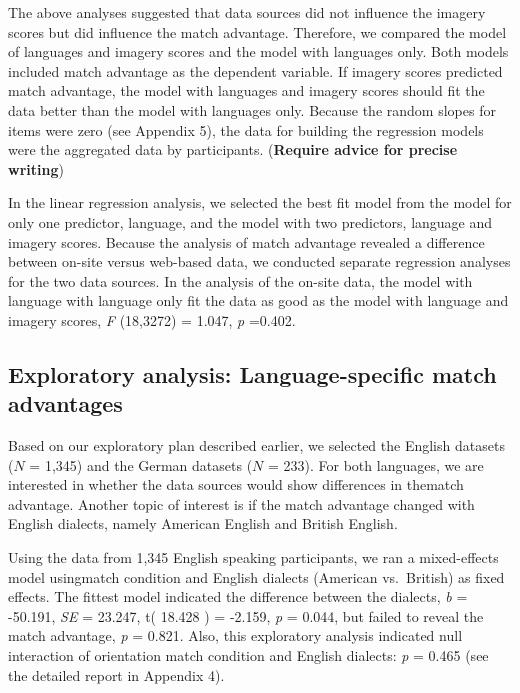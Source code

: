\documentclass[
  man,floatsintext]{apa6}
\begin{document}
The above analyses suggested that data sources did not influence the imagery scores but did influence the match advantage. Therefore, we compared the model of languages and imagery scores and the model with languages only. Both models included match advantage as the dependent variable. If imagery scores predicted match advantage, the model with languages and imagery scores should fit the data better than the model with languages only. Because the random slopes for items were zero (see Appendix 5), the data for building the regression models were the aggregated data by participants. (\textbf{Require advice for precise writing})

In the linear regression analysis, we selected the best fit model from the model for only one predictor, language, and the model with two predictors, language and imagery scores. Because the analysis of match advantage revealed a difference between on-site versus web-based data, we conducted separate regression analyses for the two data sources. In the analysis of the on-site data, the model with language with language only fit the data as good as the model with language and imagery scores, \emph{F} (18,3272) = 1.047, \emph{p} =0.402.

\hypertarget{exploratory-analysis-language-specific-match-advantages}{%
\subsection{Exploratory analysis: Language-specific match advantages}\label{exploratory-analysis-language-specific-match-advantages}}

Based on our exploratory plan described earlier, we selected the English datasets (\(N\) = 1,345) and the German datasets (\(N\) = 233). For both languages, we are interested in whether the data sources would show differences in thematch advantage. Another topic of interest is if the match advantage changed with English dialects, namely American English and British English.

Using the data from 1,345 English speaking participants, we ran a mixed-effects model usingmatch condition and English dialects (American vs.~British) as fixed effects. The fittest model indicated the difference between the dialects, \emph{b} = -50.191, \emph{SE} = 23.247, t( 18.428 ) = -2.159, \emph{p} = 0.044, but failed to reveal the match advantage, \emph{p} = 0.821. Also, this exploratory analysis indicated null interaction of orientation match condition and English dialects: \emph{p} = 0.465 (see the detailed report in Appendix 4).
\end{document}

